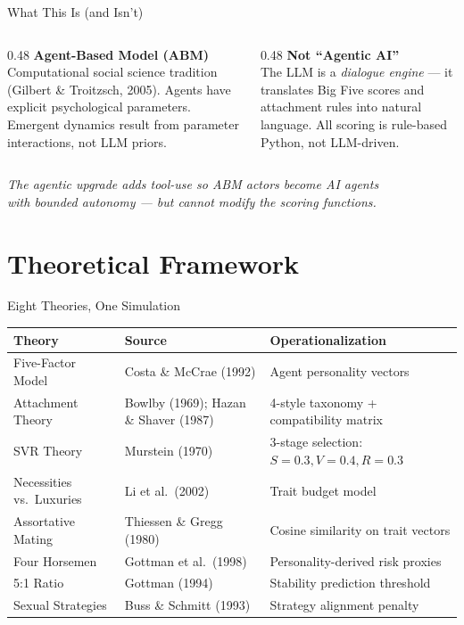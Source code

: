 \documentclass[aspectratio=169, 11pt]{beamer}
\begin{document}
\begin{frame}{What This Is (and Isn't)}
\begin{columns}[T]
\begin{column}{0.48\textwidth}
\textbf{Agent-Based Model (ABM)}\\[0.5em]
Computational social science tradition (Gilbert \& Troitzsch, 2005). Agents have explicit psychological parameters. Emergent dynamics result from parameter interactions, not LLM priors.
\end{column}
\begin{column}{0.48\textwidth}
\textbf{Not ``Agentic AI''}\\[0.5em]
The LLM is a \textit{dialogue engine} --- it translates Big Five scores and attachment rules into natural language. All scoring is rule-based Python, not LLM-driven.
\end{column}
\end{columns}

\vspace{1.5em}
\begin{center}
\textit{The agentic upgrade adds tool-use so ABM actors become AI agents\\with bounded autonomy --- but cannot modify the scoring functions.}
\end{center}
\end{frame}

\section{Theoretical Framework}

\begin{frame}{Eight Theories, One Simulation}
\small
\begin{tabular}{@{}p{3.2cm}p{4.5cm}p{4.8cm}@{}}
\toprule
\textbf{Theory} & \textbf{Source} & \textbf{Operationalization} \\
\midrule
Five-Factor Model & Costa \& McCrae (1992) & Agent personality vectors \\
Attachment Theory & Bowlby (1969); Hazan \& Shaver (1987) & 4-style taxonomy + compatibility matrix \\
SVR Theory & Murstein (1970) & 3-stage selection: $S{=}0.3, V{=}0.4, R{=}0.3$ \\
Necessities vs.\ Luxuries & Li et al.\ (2002) & Trait budget model \\
Assortative Mating & Thiessen \& Gregg (1980) & Cosine similarity on trait vectors \\
Four Horsemen & Gottman et al.\ (1998) & Personality-derived risk proxies \\
5:1 Ratio & Gottman (1994) & Stability prediction threshold \\
Sexual Strategies & Buss \& Schmitt (1993) & Strategy alignment penalty \\
\bottomrule
\end{tabular}
\end{frame}
\end{document}
